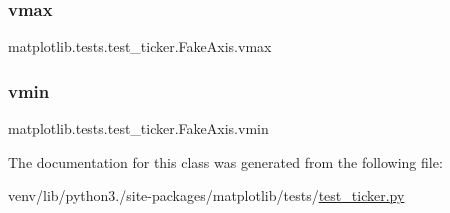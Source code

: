 \subsubsection{\texorpdfstring{vmax}{vmax}}
{\footnotesize\ttfamily matplotlib.\+tests.\+test\+\_\+ticker.\+Fake\+Axis.\+vmax}

\mbox{\label{classmatplotlib_1_1tests_1_1test__ticker_1_1FakeAxis_ab53392e5033382880fd199c0ca1355ff}} 
\subsubsection{\texorpdfstring{vmin}{vmin}}
{\footnotesize\ttfamily matplotlib.\+tests.\+test\+\_\+ticker.\+Fake\+Axis.\+vmin}



The documentation for this class was generated from the following file\+:\begin{DoxyCompactItemize}
\item 
venv/lib/python3./site-\/packages/matplotlib/tests/\hyperlink{test__ticker_8py}{test\+\_\+ticker.\+py}\end{DoxyCompactItemize}
